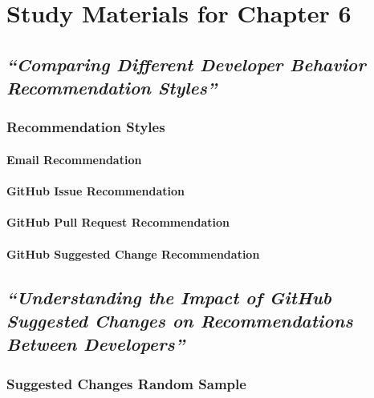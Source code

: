 \chapter{Study Materials for Chapter 6}
\label{app-suggs}

\section{\em ``Comparing Different Developer Behavior Recommendation Styles''}

\subsection{Recommendation Styles}
\label{app-suggs-recs}
\subsubsection{Email Recommendation}




\subsubsection{GitHub Issue Recommendation}




\subsubsection{GitHub Pull Request Recommendation}



\subsubsection{GitHub Suggested Change Recommendation}



\newpage

\section{\em ``Understanding the Impact of GitHub Suggested Changes on Recommendations Between Developers''}

\subsection{Suggested Changes Random Sample}
\label{app-suggs-sample}

